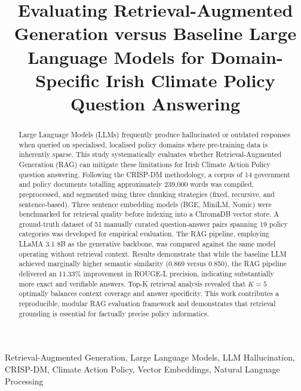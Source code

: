 \documentclass[conference]{IEEEtran}
\begin{document}
\title{Evaluating Retrieval-Augmented Generation versus Baseline Large Language Models for Domain-Specific Irish Climate Policy Question Answering}

\author{
}

\maketitle

\begin{abstract}
Large Language Models (LLMs) frequently produce hallucinated or outdated responses when queried on specialised, localised policy domains where pre-training data is inherently sparse. This study systematically evaluates whether Retrieval-Augmented Generation (RAG) can mitigate these limitations for Irish Climate Action Policy question answering. Following the CRISP-DM methodology, a corpus of 14 government and policy documents totalling approximately 239,000 words was compiled, preprocessed, and segmented using three chunking strategies (fixed, recursive, and sentence-based). Three sentence embedding models (BGE, MiniLM, Nomic) were benchmarked for retrieval quality before indexing into a ChromaDB vector store. A ground-truth dataset of 51 manually curated question-answer pairs spanning 19 policy categories was developed for empirical evaluation. The RAG pipeline, employing LLaMA 3.1 8B as the generative backbone, was compared against the same model operating without retrieval context. Results demonstrate that while the baseline LLM achieved marginally higher semantic similarity (0.869 versus 0.850), the RAG pipeline delivered an 11.33\% improvement in ROUGE-L precision, indicating substantially more exact and verifiable answers. Top-K retrieval analysis revealed that $K{=}5$ optimally balances context coverage and answer specificity. This work contributes a reproducible, modular RAG evaluation framework and demonstrates that retrieval grounding is essential for factually precise policy informatics.
\end{abstract}

\begin{IEEEkeywords}
Retrieval-Augmented Generation, Large Language Models, LLM Hallucination, CRISP-DM, Climate Action Policy, Vector Embeddings, Natural Language Processing
\end{IEEEkeywords}
\end{document}
